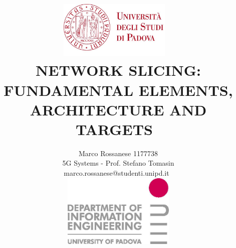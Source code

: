 \documentclass[a4paper,12pt]{report} %
\begin{document}
\clearpage\pagestyle{empty}

\title{
\includegraphics[width=0.4\textwidth]{pics/unipd.jpg}~\\[1.5cm]
NETWORK SLICING:\\
FUNDAMENTAL ELEMENTS, ARCHITECTURE AND TARGETS~\\[2cm] 
}

\author{Marco Rossanese 1177738
\\5G Systems - Prof. Stefano Tomasin
\\marco.rossanese@studenti.unipd.it~\\[1cm]\includegraphics[width=0.4\textwidth]{pics/dei.jpg}
}

\maketitle
\newpage


\tableofcontents
\newpage
\printglossaries
\newpage
\end{document}
